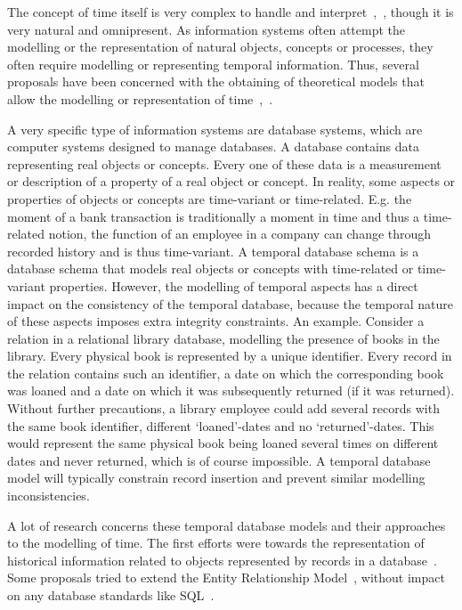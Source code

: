 %
%

The concept of time itself is very complex to handle and interpret~\cite{klein94},~\cite{Shackle61}, though it is very natural and omnipresent. As information systems often attempt the modelling or the representation of natural objects, concepts or processes, they often require modelling or representing temporal information. Thus, several proposals have been concerned with the obtaining of theoretical models that allow the modelling or representation of time~\cite{Bolour82},~\cite{Cru97}.

A very specific type of information systems are database systems, which are computer systems designed to manage databases. A database contains data representing real objects or concepts. Every one of these data is a measurement or description of a property of a real object or concept. In reality, some aspects or properties of objects or concepts are time-variant or time-related. E.g. the moment of a bank transaction is traditionally a moment in time and thus a time-related notion, the function of an employee in a company can change through recorded history and is thus time-variant. A temporal database schema is a database schema that models real objects or concepts with time-related or time-variant properties. However, the modelling of temporal aspects has a direct impact on the consistency of the temporal database, because the temporal nature of these aspects imposes extra integrity constraints. An example. Consider a relation in a relational library database, modelling the presence of books in the library. Every physical book is represented by a unique identifier. Every record in the relation contains such an identifier, a date on which the corresponding book was loaned and a date on which it was subsequently returned (if it was returned). Without further precautions, a library employee could add several records with the same book identifier, different `loaned'-dates and no `returned'-dates. This would represent the same physical book being loaned several times on different dates and never returned, which is of course impossible. A temporal database model will typically constrain record insertion and prevent similar modelling inconsistencies.

A lot of research concerns these temporal database models and their approaches to the modelling of time. The first efforts were towards the representation of historical information related to objects represented by records in a database~\cite{Clifford:1985:AHR:971699.318922}. Some proposals tried to extend the Entity Relationship Model~\cite{Klopprogge:1983}, without impact on any database standards like SQL~\cite{Sarda:1990:ESH:627277.627409}.

